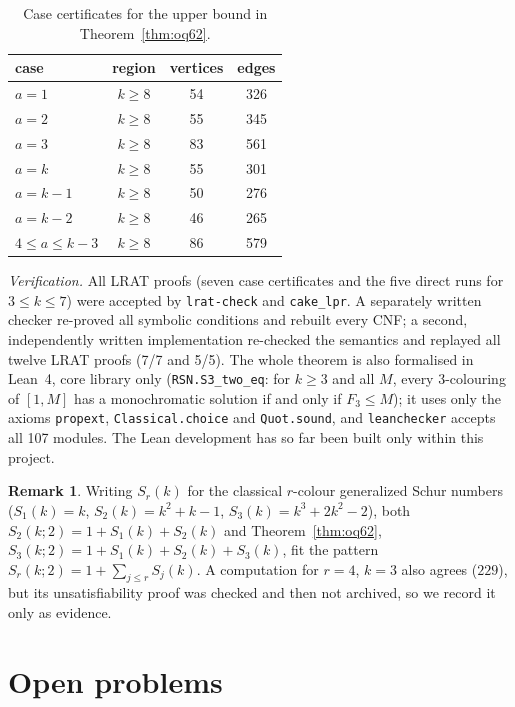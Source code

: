 \documentclass[11pt]{amsart}
\theoremstyle{definition}
\newtheorem{remark}[theorem]{Remark}
\begin{document}
\begin{table}[h]
\centering
\begin{tabular}{lccc}
\toprule
case & region & vertices & edges\\
\midrule
$a=1$ & $k\ge8$ & 54 & 326\\
$a=2$ & $k\ge8$ & 55 & 345\\
$a=3$ & $k\ge8$ & 83 & 561\\
$a=k$ & $k\ge8$ & 55 & 301\\
$a=k-1$ & $k\ge8$ & 50 & 276\\
$a=k-2$ & $k\ge8$ & 46 & 265\\
$4\le a\le k-3$ & $k\ge8$ & 86 & 579\\
\bottomrule
\end{tabular}
\caption{Case certificates for the upper bound in Theorem~\ref{thm:oq62}.}
\label{tab:oq62}
\end{table}

\noindent\emph{Verification.} All LRAT proofs (seven case certificates and the five direct runs for $3\le k\le7$) were accepted by \texttt{lrat-check} and \texttt{cake\_lpr}. A separately written checker re-proved all symbolic conditions and rebuilt every CNF; a second, independently written implementation re-checked the semantics and replayed all twelve LRAT proofs (7/7 and 5/5). The whole theorem is also formalised in Lean~4, core library only (\texttt{RSN.S3\_two\_eq}: for $k\ge3$ and all $M$, every 3-colouring of $[1,M]$ has a monochromatic solution if and only if $F_3\le M$); it uses only the axioms \texttt{propext}, \texttt{Classical.choice} and \texttt{Quot.sound}, and \texttt{leanchecker} accepts all 107 modules. The Lean development has so far been built only within this project.

\begin{remark}
Writing $S_r(k)$ for the classical $r$-colour generalized Schur numbers ($S_1(k)=k$, $S_2(k)=k^2+k-1$, $S_3(k)=k^3+2k^2-2$), both $S_2(k;2)=1+S_1(k)+S_2(k)$ and Theorem~\ref{thm:oq62}, $S_3(k;2)=1+S_1(k)+S_2(k)+S_3(k)$, fit the pattern $S_r(k;2)=1+\sum_{j\le r}S_j(k)$. A computation for $r=4$, $k=3$ also agrees ($229$), but its unsatisfiability proof was checked and then not archived, so we record it only as evidence.
\end{remark}

\section{Open problems}
\end{document}
